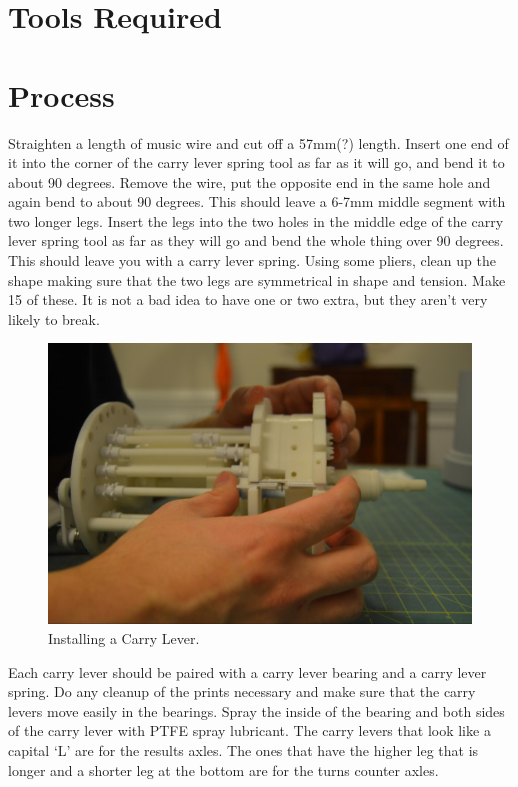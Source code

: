 \documentclass[openany]{book}
\begin{document}
\section{Tools Required}

\section{Process}
Straighten a length of music wire and cut off a 57mm(?) length. Insert one end of it into the corner of the carry lever spring tool as far as it will go, and bend it to about 90 degrees. Remove the wire, put the opposite end in the same hole and again bend to about 90 degrees. This should leave a 6-7mm middle segment with two longer legs. Insert the legs into the two holes in the middle edge of the carry lever spring tool as far as they will go and bend the whole thing over 90 degrees. This should leave you with a carry lever spring. Using some pliers, clean up the shape making sure that the two legs are symmetrical in shape and tension. Make 15 of these. It is not a bad idea to have one or two extra, but they aren’t very likely to break.

\begin{figure}[!ht]
	\centering
	\includegraphics[width=.75\textwidth]{images/image44.jpg}
	\caption{Installing a Carry Lever.}
	\label{fig:image44}	
\end{figure}

Each carry lever should be paired with a carry lever bearing and a carry lever spring. Do any cleanup of the prints necessary and make sure that the carry levers move easily in the bearings. Spray the inside of the bearing and both sides of the carry lever with PTFE spray lubricant. The carry levers that look like a capital ‘L’ are for the results axles. The ones that have the higher leg that is longer and a shorter leg at the bottom are for the turns counter axles.
\end{document}
